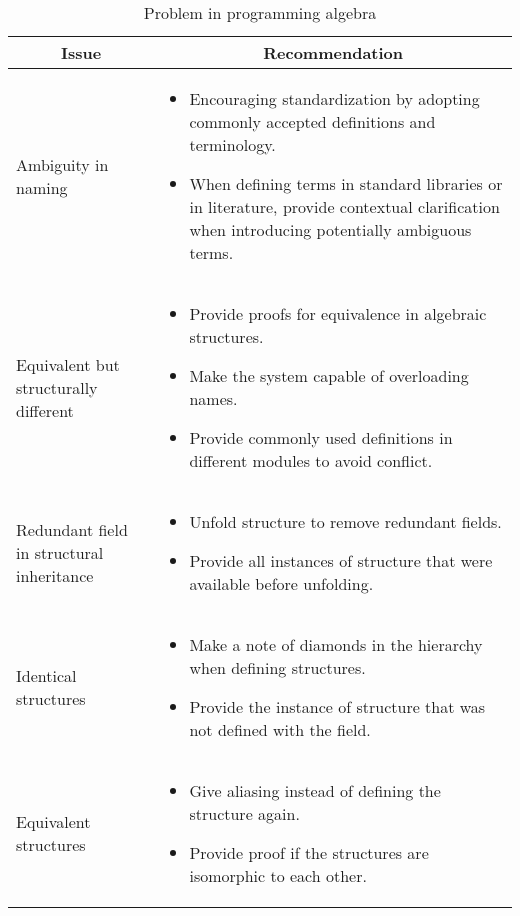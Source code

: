 \begin{longtable}{|p{4cm}|p{9cm}|}
  \caption{Problem in programming algebra} 
  \hline \multicolumn{1}{|c|}{\textbf{Issue}} & \multicolumn{1}{c|}{\textbf{Recommendation}}\\
  \hline
  Ambiguity in naming & \begin{itemize}[left=0pt,topsep=0pt]
      \item Encouraging standardization by adopting commonly accepted definitions
      and terminology.
      \item When defining terms in standard libraries or in literature, provide
      contextual clarification when introducing potentially ambiguous terms.
    \end{itemize}\nointerlineskip\\
  \hline
  Equivalent but structurally different & \begin{itemize}[left=0pt,topsep=0pt]
    \item Provide proofs for equivalence in algebraic structures.
    \item Make the system capable of overloading names.
    \item Provide commonly used definitions in different modules to avoid conflict.
  \end{itemize}\nointerlineskip\\
  \hline
  Redundant field in structural inheritance & \begin{itemize}[left=0pt,topsep=0pt]
    \item Unfold structure to remove redundant fields.
    \item Provide all instances of structure that were available before unfolding. 
  \end{itemize}\nointerlineskip\\
  \hline
  Identical structures & \begin{itemize}[left=0pt,topsep=0pt]
    \item Make a note of diamonds in the hierarchy when defining structures.
    \item Provide the instance of structure that was not defined with the field.
  \end{itemize}\nointerlineskip\\
  \hline
  Equivalent structures &\begin{itemize}[left=0pt,topsep=0pt]
    \item Give aliasing instead of defining the structure again.
    \item Provide proof if the structures are isomorphic to each other.
  \end{itemize}\nointerlineskip\\
  \hline
  \end{longtable}

